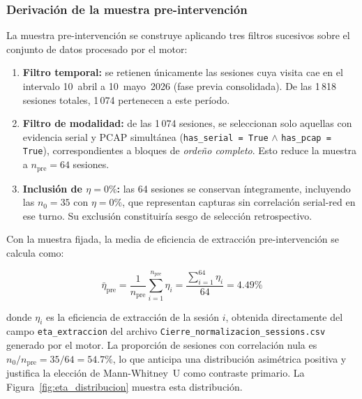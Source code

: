 \subsubsection*{Derivación de la muestra pre-intervención}

La muestra pre-intervención se construye aplicando tres filtros sucesivos sobre el conjunto de datos procesado por el motor:

\begin{enumerate}
    \item \textbf{Filtro temporal:} se retienen únicamente las sesiones cuya visita cae en el intervalo 10~abril a 10~mayo~2026 (fase previa consolidada). De las 1\,818 sesiones totales, 1\,074 pertenecen a este período.
    \item \textbf{Filtro de modalidad:} de las 1\,074 sesiones, se seleccionan solo aquellas con evidencia serial y \ac{PCAP} simultánea (\texttt{has\_serial = True} $\land$ \texttt{has\_pcap = True}), correspondientes a bloques de \textit{ordeño completo}. Esto reduce la muestra a $n_{\text{pre}} = 64$ sesiones.
    \item \textbf{Inclusión de $\eta = 0\%$:} las 64 sesiones se conservan íntegramente, incluyendo las $n_0 = 35$ con $\eta = 0\%$, que representan capturas sin correlación serial-red en ese turno. Su exclusión constituiría sesgo de selección retrospectivo.
\end{enumerate}

Con la muestra fijada, la media de eficiencia de extracción pre-intervención se calcula como:

\begin{equation}
    \bar{\eta}_{\text{pre}} = \frac{1}{n_{\text{pre}}} \sum_{i=1}^{n_{\text{pre}}} \eta_i = \frac{\sum_{i=1}^{64} \eta_i}{64} = 4.49\%
    \label{eq:eta_pre_media}
\end{equation}

donde $\eta_i$ es la eficiencia de extracción de la sesión $i$, obtenida directamente del campo \texttt{eta\_extraccion} del archivo \texttt{Cierre\_normalizacion\_sessions.csv} generado por el motor. La proporción de sesiones con correlación nula es $n_0/n_{\text{pre}} = 35/64 = 54.7\%$, lo que anticipa una distribución asimétrica positiva y justifica la elección de Mann-Whitney~U como contraste primario. La Figura~\ref{fig:eta_distribucion} muestra esta distribución.

